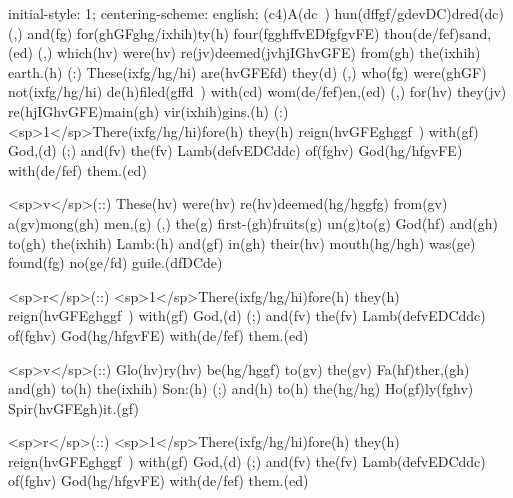 initial-style: 1;
centering-scheme: english;
(c4)A(dc~) hun(dffgf/gdevDC)dred(dc) (,) and(fg) for(ghGFghg/ixhih)ty(h) four(fgghffvEDfgfgvFE) thou(de/fef)sand,(ed) (,) which(hv) were(hv) re(jv)deemed(jvhjIGhvGFE) from(gh) the(ixhih) earth.(h) (:) These(ixfg/hg/hi) are(hvGFEfd) they(d) (,) who(fg) were(ghGF) not(ixfg/hg/hi) de(h)filed(gffd~) with(cd) wom(de/fef)en,(ed) (,) for(hv) they(jv) re(hjIGhvGFE)main(gh) vir(ixhih)gins.(h) (:) <sp>1</sp>There(ixfg/hg/hi)fore(h) they(h) reign(hvGFEghggf~) with(gf) God,(d) (;) and(fv) the(fv) Lamb(defvEDCddc) of(fghv) God(hg/hfgvFE) with(de/fef) them.(ed)

<sp>v</sp>(::) These(hv) were(hv) re(hv)deemed(hg/hggfg) from(gv) a(gv)mong(gh) men,(g) (,) the(g) first-(gh)fruits(g) un(g)to(g) God(hf) and(gh) to(gh) the(ixhih) Lamb:(h) and(gf) in(gh) their(hv) mouth(hg/hgh) was(ge) found(fg) no(ge/fd) guile.(dfDCde)

<sp>r</sp>(::) <sp>1</sp>There(ixfg/hg/hi)fore(h) they(h) reign(hvGFEghggf~) with(gf) God,(d) (;) and(fv) the(fv) Lamb(defvEDCddc) of(fghv) God(hg/hfgvFE) with(de/fef) them.(ed)

<sp>v</sp>(::) Glo(hv)ry(hv) be(hg/hggf) to(gv) the(gv) Fa(hf)ther,(gh) and(gh) to(h) the(ixhih) Son:(h) (;) and(h) to(h) the(hg/hg) Ho(gf)ly(fghv) Spir(hvGFEgh)it.(gf)

<sp>r</sp>(::) <sp>1</sp>There(ixfg/hg/hi)fore(h) they(h) reign(hvGFEghggf~) with(gf) God,(d) (;) and(fv) the(fv) Lamb(defvEDCddc) of(fghv) God(hg/hfgvFE) with(de/fef) them.(ed)